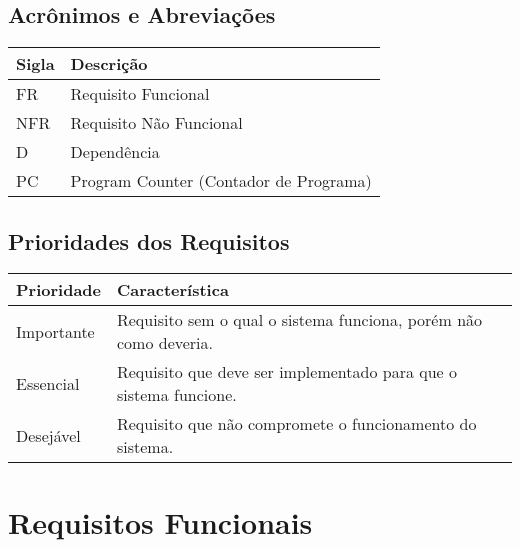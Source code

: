 \documentclass{article}
\begin{document}
  \subsection{Acrônimos e Abreviações}
    \FloatBarrier
    \begin{table}[H]
      \begin{center}
        \begin{tabular}[pos]{|m{2cm} | m{12cm}|} 
          \hline
          \cellcolor[gray]{0.9}\textbf{Sigla} & \cellcolor[gray]{0.9}\textbf{Descrição} \\ \hline
          FR      & Requisito Funcional  \\ \hline
          NFR     & Requisito Não Funcional  \\ \hline
          D       & Dependência  \\ \hline
          PC       & Program Counter (Contador de Programa)  \\ \hline
        \end{tabular}
      \end{center}
    \end{table}  

  \subsection{Prioridades dos Requisitos}
    \FloatBarrier
    \begin{table}[H]
      \begin{center}
        \begin{tabular}[pos]{|m{2cm} | m{12cm}|} 
          \hline
          \cellcolor[gray]{0.9}\textbf{Prioridade} & \cellcolor[gray]{0.9}\textbf{Característica} \\ \hline
          Importante      & Requisito sem o qual o sistema funciona, porém não como deveria.  \\ \hline
          Essencial       & Requisito que deve ser implementado para que o sistema funcione.  \\ \hline
          Desejável       & Requisito que não compromete o funcionamento do sistema.  \\ \hline
        \end{tabular}
      \end{center}
    \end{table}  

  \section{Requisitos Funcionais}
\end{document}
